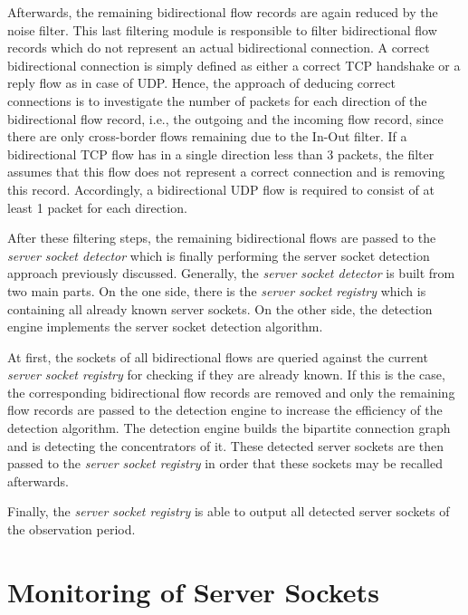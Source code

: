 Afterwards, the remaining bidirectional flow records are again reduced by the noise filter. This last filtering module is responsible to filter bidirectional flow records which do not represent an actual bidirectional connection. A correct bidirectional connection is simply defined as either a correct \gls{TCP} handshake or a reply flow as in case of \gls{UDP}. Hence, the approach of deducing correct connections is to investigate the number of packets for each direction of the bidirectional flow record, i.e., the outgoing and the incoming flow record, since there are only cross-border flows remaining due to the In-Out filter. 
If a bidirectional \gls{TCP} flow has in a single direction less than 3 packets, the filter assumes that this flow does not represent a correct connection and is removing this record. Accordingly, a bidirectional \gls{UDP} flow is required to consist of at least 1 packet for each direction. 

After these filtering steps, the remaining bidirectional flows are passed to the \emph{server socket detector} which is finally performing the \gls{server socket} detection approach previously discussed. 
Generally, the \emph{server socket detector} is built from two main parts. On the one side, there is the \emph{server socket registry} which is containing all already known \glspl{server socket}. 
On the other side, the detection engine implements the \gls{server socket} detection algorithm.

At first, the sockets of all bidirectional flows are queried against the current \emph{server socket registry} for checking if they are already known. 
If this is the case, the corresponding bidirectional flow records are removed and only the remaining flow records are passed to the detection engine to increase the efficiency of the detection algorithm. 
The detection engine builds the bipartite connection graph and is detecting the concentrators of it.
These detected \glspl{server socket} are then passed to the \emph{server socket registry} in order that these sockets may be recalled afterwards.

Finally, the \emph{server socket registry} is able to output all detected \glspl{server socket} of the observation period.

\newpage
\section{Monitoring of Server Sockets
\label{section:socket_tracking}}

